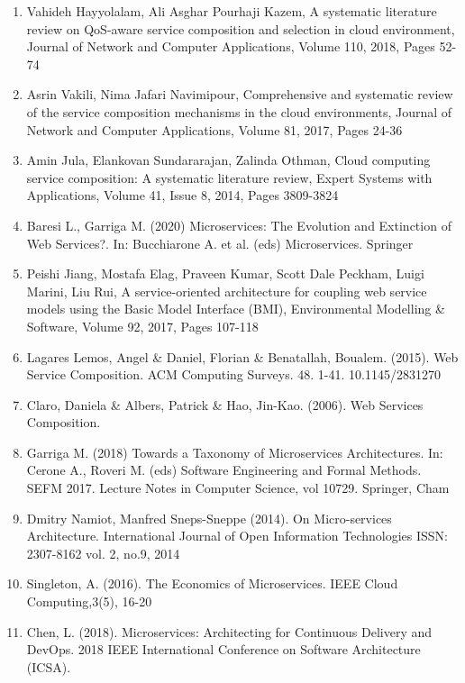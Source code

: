 \documentclass{article}
\begin{document}
\begin{enumerate}

\item Vahideh Hayyolalam, Ali Asghar Pourhaji Kazem, A systematic literature review on QoS-aware service composition and selection in cloud environment, Journal of Network and Computer Applications, Volume 110, 2018, Pages 52-74



\item Asrin Vakili, Nima Jafari Navimipour, Comprehensive and systematic review of the service composition mechanisms in the cloud environments, Journal of Network and Computer Applications, Volume 81, 2017, Pages 24-36

\item Amin Jula, Elankovan Sundararajan, Zalinda Othman, Cloud computing service composition: A systematic literature review, Expert Systems with Applications, Volume 41, Issue 8, 2014,
Pages 3809-3824

\item Baresi L., Garriga M. (2020) Microservices: The Evolution and Extinction of Web Services?. In: Bucchiarone A. et al. (eds) Microservices. Springer

\item Peishi Jiang, Mostafa Elag, Praveen Kumar, Scott Dale Peckham, Luigi Marini, Liu Rui,
A service-oriented architecture for coupling web service models using the Basic Model Interface (BMI), Environmental Modelling \& Software, Volume 92, 2017, Pages 107-118

\item Lagares Lemos, Angel \& Daniel, Florian \& Benatallah, Boualem. (2015). Web Service Composition. ACM Computing Surveys. 48. 1-41. 10.1145/2831270

\item Claro, Daniela \& Albers, Patrick \& Hao, Jin-Kao. (2006). Web Services Composition. 

\item Garriga M. (2018) Towards a Taxonomy of Microservices Architectures. In: Cerone A., Roveri M. (eds) Software Engineering and Formal Methods. SEFM 2017. Lecture Notes in Computer Science, vol 10729. Springer, Cham

\item Dmitry Namiot, Manfred Sneps-Sneppe (2014). On Micro-services Architecture. International Journal of Open Information Technologies ISSN: 2307-8162 vol. 2, no.9, 2014

\item Singleton, A. (2016). The Economics of Microservices. IEEE Cloud Computing,3(5), 16-20

\item Chen, L. (2018). Microservices: Architecting for Continuous Delivery and DevOps. 2018 IEEE International Conference on Software Architecture (ICSA). 


\end{enumerate}
\end{document}

